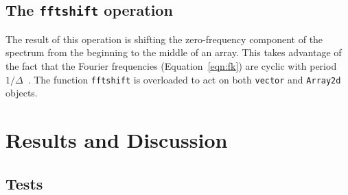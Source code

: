 \documentclass[11pt]{article}
\begin{document}
\subsection{The \texttt{fftshift} operation}
The result of this operation is shifting the zero-frequency component of the spectrum from the beginning to the middle of an array. This takes advantage of the fact that the Fourier frequencies (Equation~\ref{eqn:fk}) are cyclic with period $1/\Delta$~\cite[Section~12.1.2]{NumRecipes}. The function \texttt{fftshift} is overloaded to act on both \texttt{vector} and \texttt{Array2d} objects.

\section{Results and Discussion}\label{sec:res}
\subsection{Tests}
\end{document}
